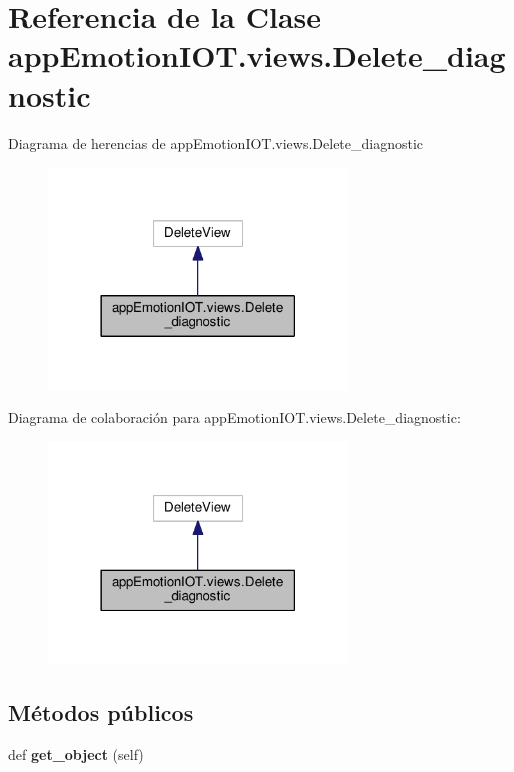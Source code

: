 \hypertarget{classappEmotionIOT_1_1views_1_1Delete__diagnostic}{}\section{Referencia de la Clase app\+Emotion\+I\+O\+T.\+views.\+Delete\+\_\+diagnostic}
\label{classappEmotionIOT_1_1views_1_1Delete__diagnostic}


Diagrama de herencias de app\+Emotion\+I\+O\+T.\+views.\+Delete\+\_\+diagnostic
\nopagebreak
\begin{figure}[H]
\begin{center}
\leavevmode
\includegraphics[width=225pt]{classappEmotionIOT_1_1views_1_1Delete__diagnostic__inherit__graph}
\end{center}
\end{figure}


Diagrama de colaboración para app\+Emotion\+I\+O\+T.\+views.\+Delete\+\_\+diagnostic\+:
\nopagebreak
\begin{figure}[H]
\begin{center}
\leavevmode
\includegraphics[width=225pt]{classappEmotionIOT_1_1views_1_1Delete__diagnostic__coll__graph}
\end{center}
\end{figure}
\subsection*{Métodos públicos}
\begin{DoxyCompactItemize}
\item 
def {\bfseries get\+\_\+object} (self)\hypertarget{classappEmotionIOT_1_1views_1_1Delete__diagnostic_a07ffee2d6b259ca91cb7d30f03ec9770}{}\label{classappEmotionIOT_1_1views_1_1Delete__diagnostic_a07ffee2d6b259ca91cb7d30f03ec9770}

\end{DoxyCompactItemize}
